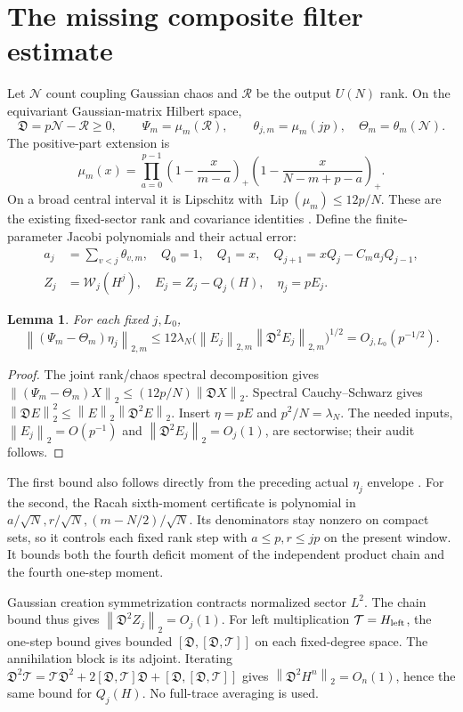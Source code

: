\documentclass[11pt]{article}
\newcommand{\Wick}{\mathcal W}
\newcommand{\Ncal}{\mathcal N}
\newcommand{\Rcal}{\mathcal R}
\newcommand{\Def}{\mathfrak D}
\newcommand{\norm}[1]{\left\lVert#1\right\rVert}
\newtheorem{lemma}{Lemma}
\begin{document}
\section{The missing composite filter estimate}
Let $\Ncal$ count coupling Gaussian chaos and $\Rcal$ be the output
$U(N)$ rank. On the equivariant Gaussian-matrix Hilbert space,
\[
 \Def=p\Ncal-\Rcal\ge0,\qquad
 \Psi_m=\mu_m(\Rcal),\qquad
 \theta_{j,m}=\mu_m(jp),\quad \Theta_m=\theta_m(\Ncal).
\]
The positive-part extension is
\[
 \mu_m(x)=\prod_{a=0}^{p-1}
 \left(1-\frac{x}{m-a}\right)_+
 \left(1-\frac{x}{N-m+p-a}\right)_+ .
\]
On a broad central interval it is Lipschitz with
$\operatorname{Lip}(\mu_m)\le12p/N$. These are the existing
fixed-sector rank and covariance identities \cite{rank,series}.
Define the finite-parameter Jacobi polynomials and their actual error:
\begin{align}
 a_j&=\sum_{v<j}\theta_{v,m},\quad Q_0=1,\quad Q_1=x,\quad
 Q_{j+1}=xQ_j-C_ma_jQ_{j-1},\nonumber\\
 Z_j&=\Wick_j(H^j),\quad E_j=Z_j-Q_j(H),\quad\eta_j=pE_j .
\end{align}
\begin{lemma}\label{filter}
For each fixed $j,L_0$,
\[
 \norm{(\Psi_m-\Theta_m)\eta_j}_{2,m}
 \le12\lambda_N
       \bigl(\norm{E_j}_{2,m}\norm{\Def^2E_j}_{2,m}\bigr)^{1/2}
 =O_{j,L_0}(p^{-1/2}).
\]
\end{lemma}
\begin{proof}
The joint rank/chaos spectral decomposition gives
$\norm{(\Psi_m-\Theta_m)X}_2\le(12p/N)\norm{\Def X}_2$.
Spectral Cauchy--Schwarz gives
$\norm{\Def E}_2^2\le\norm E_2\norm{\Def^2E}_2$.
Insert $\eta=pE$ and $p^2/N=\lambda_N$.
The needed inputs, $\norm{E_j}_2=O(p^{-1})$ and
$\norm{\Def^2E_j}_2=O_j(1)$, are sectorwise; their audit follows.
\end{proof}
The first bound also follows directly from the preceding actual
$\eta_j$ envelope \cite{gradient,operator}. For the second, the Racah
sixth-moment certificate \cite{central,series} is polynomial in
$a/\sqrt N,r/\sqrt N,(m-N/2)/\sqrt N$. Its denominators stay nonzero
on compact sets, so it controls each fixed rank step with
$a\le p,r\le jp$ on the present window. It bounds both the fourth
deficit moment of the independent product chain and the fourth
one-step moment.

Gaussian creation symmetrization contracts normalized sector $L^2$.
The chain bound thus gives $\norm{\Def^2Z_j}_2=O_j(1)$.
For left multiplication $\mathcal T=H_{\rm left}$, the one-step bound
gives bounded $[\Def,[\Def,\mathcal T]]$ on each fixed-degree space.
The annihilation block is its adjoint. Iterating
$\Def^2\mathcal T=\mathcal T\Def^2+
2[\Def,\mathcal T]\Def+[\Def,[\Def,\mathcal T]]$
gives $\norm{\Def^2H^n}_2=O_n(1)$, hence the same bound for $Q_j(H)$.
No full-trace averaging is used.
\end{document}
